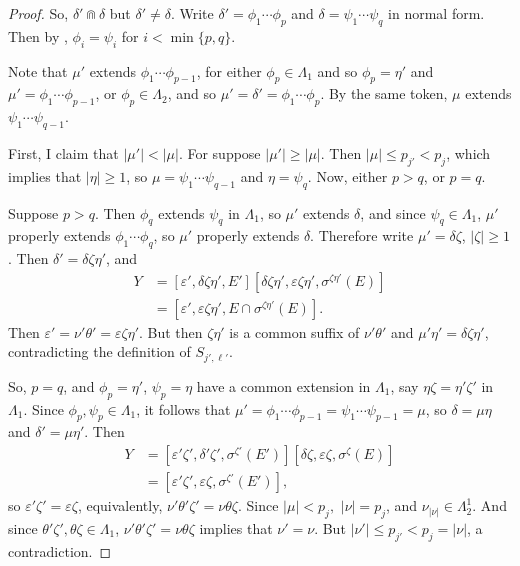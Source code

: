 \documentclass[12pt]{amsart}
\newcommand{\al}{\alpha}
\newcommand{\be}{\beta}
\newcommand{\de}{\delta}
\newcommand{\ep}{\varepsilon}
\newcommand{\ze}{\zeta}
\renewcommand{\th}{\theta}
\newcommand{\La}{\Lambda}
\newcommand{\si}{\sigma}
\theoremstyle{plain} %
\theoremstyle{definition} %
\begin{document}
\begin{proof}
    So, $\de' \Cap \de$ but $\de' \neq \de$. %
    Write $\de' = \phi_1 \cdots \phi_p$ and $\de = \psi_1 \cdots \psi_q$ in normal form. 
    Then by \cite[Theorem 3.4]{MS22}, $\phi_i = \psi_i$ for $i < \min\{p, q\}$.
    
    Note that $\mu'$ extends $\phi_1 \cdots \phi_{p-1}$, for either $\phi_p \in \La_1$ and so $\phi_p = \eta'$ and $\mu' = \phi_1 \cdots \phi_{p-1}$, or $\phi_p \in \La_2$, and so $\mu' = \de' = \phi_1 \cdots \phi_p$. By the same token, $\mu$ extends $\psi_1 \cdots \psi_{q-1}$.

    First, I claim that $|\mu'| < |\mu|$. For suppose $|\mu'| \ge |\mu|$. Then $|\mu| \leq p_{j'} < p_j$, which implies  that $|\eta| \ge 1$, so $\mu = \psi_1 \cdots \psi_{q-1}$ and $\eta = \psi_q$. Now, either $p > q$, or $p = q$.

    Suppose $p > q$. Then $\phi_q$ extends $\psi_q$ in $\La_1$, so $\mu'$ extends $\de$, and since $\psi_q \in \La_1$, $\mu'$ properly extends $\phi_1 \cdots \phi_q$, so $\mu'$ properly extends $\de$. Therefore write $\mu' = \de \ze$, $|\ze| \ge 1$. Then $\de' = \de \ze \eta'$, and 
    \begin{align*}
        Y &= [\ep', \de\ze\eta', E'][\de\ze\eta', \ep\ze\eta', \si^{\ze\eta'}(E)]\\
        &= [\ep', \ep\ze\eta', E\cap \si^{\ze\eta'}(E)].
    \end{align*}
    Then $\ep' = \nu' \th' = \ep \ze \eta'$. But then $\ze \eta'$ is a common suffix of $\nu'\th'$ and $\mu' \eta' = \de\ze\eta'$, contradicting the definition of $S_{j',\ell'}$.

    So, $p = q$, and $\phi_p = \eta'$, $\psi_p = \eta$ have a common extension in $\La_1$, say $\eta \ze = \eta' \ze'$ in $\La_1$. Since $\phi_p, \psi_p \in \La_1$, it follows that $\mu' = \phi_1 \cdots \phi_{p-1} = \psi_1 \cdots \psi_{p-1} = \mu$, so $\de = \mu \eta$ and $\de' = \mu \eta'$. Then
    \begin{align*}
        Y &= [\ep'\ze', \de'\ze', \si^{\ze'}(E')] [\de\ze, \ep\ze, \si^{\ze}(E)]\\
        &=  [\ep'\ze', \ep\ze, \si^{\ze'}(E')],
    \end{align*}
    so $\ep'\ze' = \ep \ze$, equivalently, $\nu' \th' \ze' = \nu \th \ze$. Since $|\mu| < p_j,$ $|\nu| = p_j$, and $\nu_{|\nu|} \in \La_2^1$. And since $\th' \ze', \th \ze \in \La_1$, $\nu' \th' \ze' = \nu \th \ze$ implies that $\nu' = \nu$. But $|\nu'| \le p_{j'} < p_j = |\nu|$, a contradiction.


\end{proof}
\end{document}

